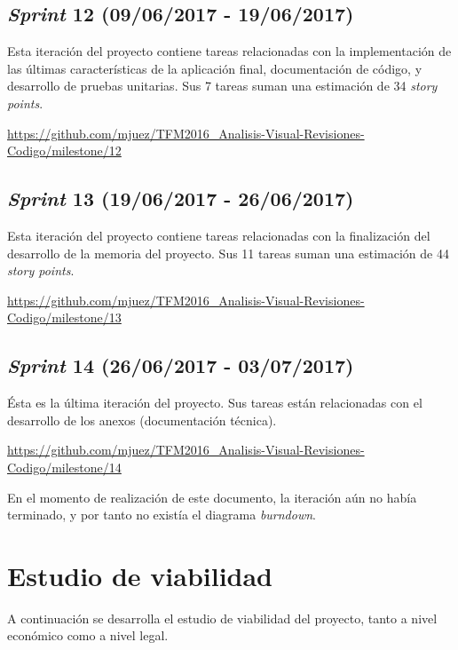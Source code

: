 
\subsection{\textit{Sprint} 12 (09/06/2017 - 19/06/2017)}

Esta iteración del proyecto contiene tareas relacionadas con la implementación de las últimas características de la aplicación final, documentación de código, y desarrollo de pruebas unitarias. Sus 7 tareas suman una estimación de 34 \textit{story points}.

\url{https://github.com/mjuez/TFM2016_Analisis-Visual-Revisiones-Codigo/milestone/12}


\subsection{\textit{Sprint} 13 (19/06/2017 - 26/06/2017)}

Esta iteración del proyecto contiene tareas relacionadas con la finalización del desarrollo de la memoria del proyecto. Sus 11 tareas suman una estimación de 44 \textit{story points}.

\url{https://github.com/mjuez/TFM2016_Analisis-Visual-Revisiones-Codigo/milestone/13}


\subsection{\textit{Sprint} 14 (26/06/2017 - 03/07/2017)}

Ésta es la última iteración del proyecto. Sus tareas están relacionadas con el desarrollo de los anexos (documentación técnica).

\url{https://github.com/mjuez/TFM2016_Analisis-Visual-Revisiones-Codigo/milestone/14}

En el momento de realización de este documento, la iteración aún no había terminado, y por tanto no existía el diagrama \textit{burndown}.


\section{Estudio de viabilidad}

A continuación se desarrolla el estudio de viabilidad del proyecto, tanto a nivel económico como a nivel legal.

